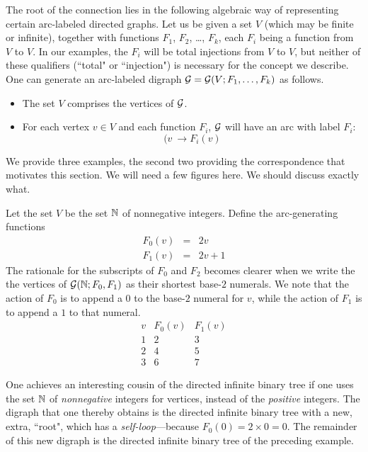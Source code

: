 The root of the connection lies in the following algebraic way of representing certain 
arc-labeled directed graphs.  Let us be given a set $V$ (which may be finite or infinite),  
together with functions $F_1$,  $F_2$, \ldots, $F_k$, each $F_i$ being a function from 
$V$ to $V$.  In our examples, the $F_i$ will be total injections from $V$ to $V$, but neither 
of these qualifiers (``total" or ``injection") is necessary for the concept we describe.  One 
can generate an arc-labeled digraph $\mbox{$\cal G$} = \mbox{$\cal G$}(V; F_1, \ldots, F_k)$ as follows.
\begin{itemize}
\item
The set $V$ comprises the vertices of $\mbox{$\cal G$}$.
\item
For each vertex $v \in V$ and each function $F_i$, $\mbox{$\cal G$}$ will have an arc with label $F_i$:
\[ (v \ \rightarrow F_i(v) \]
\end{itemize}
We provide three examples, the second two providing the correspondence that motivates this section.
{\Arny We will need a few figures here.  We should discuss exactly what.}


Let the set $V$ be the set $\mathbb{N}$ of nonnegative integers.  Define the arc-generating functions
\begin{eqnarray*}
F_0(v) & = & 2v \\
F_1(v) & = & 2v+1
\end{eqnarray*}
The rationale for the subscripts of $F_0$ and $F_2$ becomes clearer when we write the
the vertices of $\mbox{$\cal G$}(\mathbb{N}; F_0, F_1)$ as their shortest base-$2$ numerals.  We note that the
action of $F_0$ is to append a $0$ to the base-$2$ numeral for $v$, while the  
action of $F_1$ is to append a $1$ to that numeral.
\[ \begin{array}{|c|cc|}
\hline
v & F_0(v) & F_1(v) \\
\hline
\hline
1 & 2 & 3  \\
\hline
2 & 4 & 5  \\
3 & 6 & 7 
\end{array}
\]

One achieves an interesting cousin of the directed infinite binary tree if one uses the set
$\mathbb{N}$ of {\em nonnegative} integers for vertices, instead of the {\em positive} integers.  The digraph
that one thereby obtains is the directed infinite binary tree with a new, extra,  ``root", which
has a {\em self-loop}---because $F_0(0) = 2 \times 0 = 0$.  The remainder of this new digraph is the
directed infinite binary tree of the preceding example.



